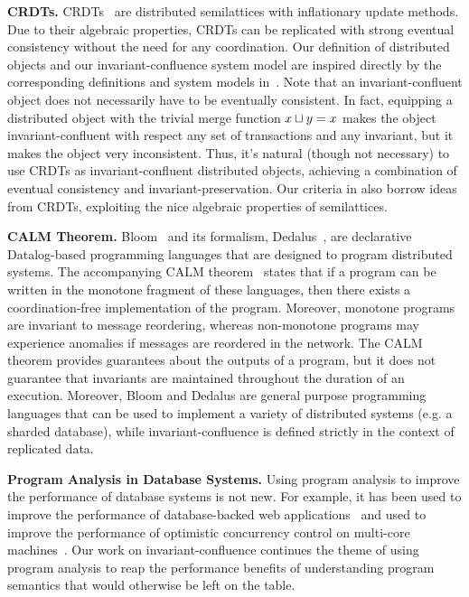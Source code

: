 %

\textbf{CRDTs.}
CRDTs~\cite{shapiro2011conflict, shapiro2011comprehensive} are distributed
semilattices with inflationary update methods. Due to their algebraic
properties, CRDTs can be replicated with strong eventual consistency without
the need for any coordination. Our definition of distributed objects and our
invariant-confluence system model are inspired directly by the corresponding
definitions and system models in~\cite{shapiro2011conflict}. Note that an
invariant-confluent object does not necessarily have to be eventually
consistent. In fact, equipping a distributed object with the trivial merge
function $x \sqcup y = x$ makes the object invariant-confluent with respect
any set of transactions and any invariant, but it makes the object very
inconsistent. Thus, it's natural (though not necessary) to use CRDTs as
invariant-confluent distributed objects, achieving a combination of eventual
consistency and invariant-preservation. Our criteria in
 also borrow ideas from CRDTs, exploiting the nice
algebraic properties of semilattices.

\textbf{CALM Theorem.}
Bloom~\cite{alvaro2010boom, alvaro2011consistency, conway2012logic} and its
formalism, Dedalus~\cite{alvaro2011dedalus, alvaro2013declarative}, are
declarative Datalog-based programming languages that are designed to program
distributed systems. The accompanying CALM
theorem~\cite{hellerstein2010declarative, ameloot2013relational} states that if
a program can be written in the monotone fragment of these languages, then
there exists a coordination-free implementation of the program. Moreover,
monotone programs are invariant to message reordering, whereas non-monotone
programs may experience anomalies if messages are reordered in the network. The
CALM theorem provides guarantees about the outputs of a program, but it does
not guarantee that invariants are maintained throughout the duration of an
execution. Moreover, Bloom and Dedalus are general purpose programming
languages that can be used to implement a variety of distributed systems (e.g.
a sharded database), while invariant-confluence is defined strictly in the
context of replicated data.

\textbf{Program Analysis in Database Systems.}
Using program analysis to improve the performance of database systems is not
new. For example, it has been used to improve the performance of
database-backed web applications~\cite{cheung2014using, wu2016transaction,
ramachandra2012program} and used to improve the performance of optimistic
concurrency control on multi-core machines~\cite{wu2016transaction}. Our work
on invariant-confluence continues the theme of using program analysis to reap
the performance benefits of understanding program semantics that would
otherwise be left on the table.

